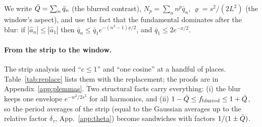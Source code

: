We write $\bar Q=\sum_n\bar q_n$ (the blurred contrast), $N_p=\sum_nn^p\bar q_n$, $\varrho=s^2/(2L^2)$ (the window's aspect), and use the fact
that the fundamental dominates after the blur: if $|\hat a_n|\le|\hat a_1|$ then $\bar q_n\le\bar q_1e^{-(n^2-1)x/2}$, and $\bar q_1\le2e^{-x/2}$.

\paragraph*{From the strip to the window.}
The strip analysis used ``$c\le1$'' and ``one cosine'' at a handful of places. Table~\ref{tab:replace} lists them with the replacement; the
proofs are in Appendix~\ref{app:plemmas}. Two structural facts carry everything: (i) the blur keeps one envelope $e^{-w^2/2s^2}$ for all
harmonics, and (ii) $1-\bar Q\le f_{\mathrm{blurred}}\le1+\bar Q$, so the period averages of the strip (equal to the Gaussian averages up to the relative factor $\delta_\tau$, App.~\ref{app:theta}) become sandwiches with factors
$1/(1\pm\bar Q)$.

